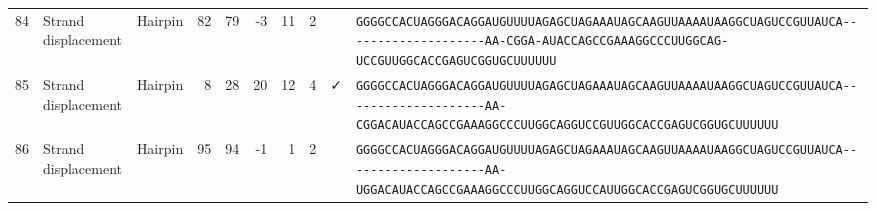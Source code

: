 \begin{tabular}{rllrrrrrcl}
 84 & Strand displacement & Hairpin & 82 & 79 & -3 & 11 & 2 &  &
 \color{ucsfdarkgrey}\verb|GGGGCCACUAGGGACAGGAU|\color{ucsforange}\verb|GUUUUA|\color{ucsfblue}\verb|GAGCUAGAAAUAGCAAGU|\color{ucsforange}\verb|UAAAAUAA|\color{ucsfnavy}\verb|GGCUAGUCCGU|\color{ucsforange}\verb|UAUCA|\color{ucsfteal}\verb|--------------------AA-CGGA-|\color{ucsfpurple}\verb|AUACCAGCCGAAAGGCCCUUGGCAG|\color{ucsfteal}\verb|-UCCGUU|\color{ucsforange}\verb|GGCACCGAGUCGGUGCUUUUUU| \\

 85 & Strand displacement & Hairpin & 8 & 28 & 20 & 12 & 4 & ✓ &
 \color{ucsfdarkgrey}\verb|GGGGCCACUAGGGACAGGAU|\color{ucsforange}\verb|GUUUUA|\color{ucsfblue}\verb|GAGCUAGAAAUAGCAAGU|\color{ucsforange}\verb|UAAAAUAA|\color{ucsfnavy}\verb|GGCUAGUCCGU|\color{ucsforange}\verb|UAUCA|\color{ucsfteal}\verb|--------------------AA-CGGAC|\color{ucsfpurple}\verb|AUACCAGCCGAAAGGCCCUUGGCAG|\color{ucsfteal}\verb|GUCCGUU|\color{ucsforange}\verb|GGCACCGAGUCGGUGCUUUUUU| \\

 86 & Strand displacement & Hairpin & 95 & 94 & -1 & 1 & 2 &  &
 \color{ucsfdarkgrey}\verb|GGGGCCACUAGGGACAGGAU|\color{ucsforange}\verb|GUUUUA|\color{ucsfblue}\verb|GAGCUAGAAAUAGCAAGU|\color{ucsforange}\verb|UAAAAUAA|\color{ucsfnavy}\verb|GGCUAGUCCGU|\color{ucsforange}\verb|UAUCA|\color{ucsfteal}\verb|--------------------AA-UGGAC|\color{ucsfpurple}\verb|AUACCAGCCGAAAGGCCCUUGGCAG|\color{ucsfteal}\verb|GUCCAUU|\color{ucsforange}\verb|GGCACCGAGUCGGUGCUUUUUU| \\

\bottomrule
\end{tabular}
